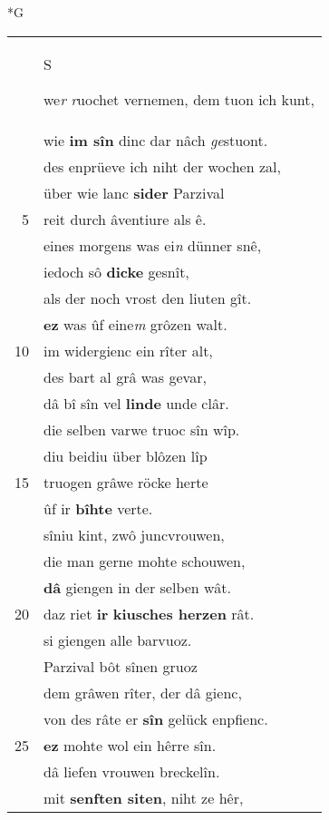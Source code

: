 \documentclass[8pt,a4paper,notitlepage]{article}
\begin{document}
\newpage
\begin{table}[ht]
\begin{minipage}[t]{0.5\linewidth}
\small
\begin{center}*G
\end{center}
\begin{tabular}{rl}
 & \begin{large}S\end{large}we\textit{r} \textit{r}uochet vernemen, dem tuon ich kunt,\\ 
 & wie \textbf{im sîn} dinc dar nâch \textit{ge}stuont.\\ 
 & des enprüeve ich niht der wochen zal,\\ 
 & über wie lanc \textbf{sider} Parzival\\ 
5 & reit durch âventiure als ê.\\ 
 & eines morgens was ei\textit{n} dünner snê,\\ 
 & iedoch sô \textbf{dicke} gesnît,\\ 
 & als der noch vrost den liuten gît.\\ 
 & \textbf{ez} was ûf eine\textit{m} grôzen walt.\\ 
10 & im widergienc ein rîter alt,\\ 
 & des bart al grâ was gevar,\\ 
 & dâ bî sîn vel \textbf{linde} unde clâr.\\ 
 & die selben varwe truoc sîn wîp.\\ 
 & diu beidiu über blôzen lîp\\ 
15 & truogen grâwe röcke herte\\ 
 & ûf ir \textbf{bîhte} verte.\\ 
 & sîniu kint, zwô juncvrouwen,\\ 
 & die man gerne mohte schouwen,\\ 
 & \textbf{dâ} giengen in der selben wât.\\ 
20 & daz riet \textbf{ir} \textbf{kiusches herzen} rât.\\ 
 & si giengen alle barvuoz.\\ 
 & Parzival bôt sînen gruoz\\ 
 & dem grâwen rîter, der dâ gienc,\\ 
 & von des râte er \textbf{sîn} gelück enpfienc.\\ 
25 & \textbf{ez} mohte wol ein hêrre sîn.\\ 
 & dâ liefen vrouwen breckelîn.\\ 
 & mit \textbf{senften siten}, niht ze hêr,\\ 

\end{tabular}
\end{minipage}
\end{table}
\end{document}
